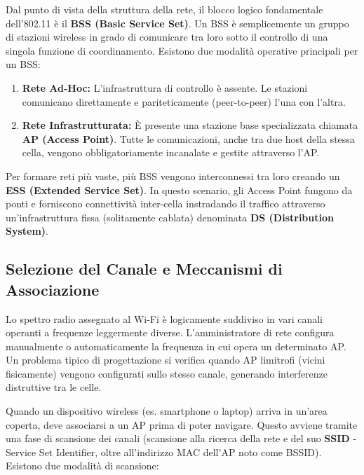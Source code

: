 \documentclass[
  italian,
  openany]{book}
\begin{document}
Dal punto di vista della struttura della rete, il blocco logico
fondamentale dell'802.11 è il \textbf{BSS (Basic Service Set)}. Un BSS è
semplicemente un gruppo di stazioni wireless in grado di comunicare tra
loro sotto il controllo di una singola funzione di coordinamento.
Esistono due modalità operative principali per un BSS:

\begin{enumerate}
\def\labelenumi{\arabic{enumi}.}
\item
  \textbf{Rete Ad-Hoc:} L'infrastruttura di controllo è assente. Le
  stazioni comunicano direttamente e pariteticamente (peer-to-peer)
  l'una con l'altra.
\item
  \textbf{Rete Infrastrutturata:} È presente una stazione base
  specializzata chiamata \textbf{AP (Access Point)}. Tutte le
  comunicazioni, anche tra due host della stessa cella, vengono
  obbligatoriamente incanalate e gestite attraverso l'AP.
\end{enumerate}

Per formare reti più vaste, più BSS vengono interconnessi tra loro
creando un \textbf{ESS (Extended Service Set)}. In questo scenario, gli
Access Point fungono da ponti e forniscono connettività inter-cella
instradando il traffico attraverso un'infrastruttura fissa (solitamente
cablata) denominata \textbf{DS (Distribution System)}.

\subsection{Selezione del Canale e Meccanismi di
Associazione}\label{selezione-del-canale-e-meccanismi-di-associazione}

Lo spettro radio assegnato al Wi-Fi è logicamente suddiviso in vari
canali operanti a frequenze leggermente diverse. L'amministratore di
rete configura manualmente o automaticamente la frequenza in cui opera
un determinato AP. Un problema tipico di progettazione si verifica
quando AP limitrofi (vicini fisicamente) vengono configurati sullo
stesso canale, generando interferenze distruttive tra le celle.

Quando un dispositivo wireless (es. smartphone o laptop) arriva in
un'area coperta, deve associarsi a un AP prima di poter navigare. Questo
avviene tramite una fase di scansione dei canali (scansione alla ricerca
della rete e del suo \textbf{SSID} - Service Set Identifier, oltre
all'indirizzo MAC dell'AP noto come BSSID). Esistono due modalità di
scansione:
\end{document}
